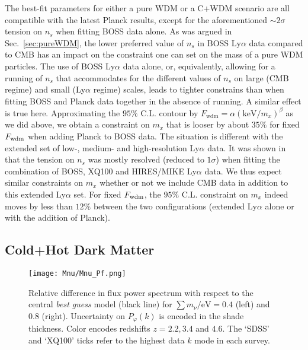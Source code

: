 The best-fit parameters for either a pure WDM or a C+WDM scenario are all compatible with the latest Planck results, except for the aforementioned $\sim 2\sigma$ tension on $n_s$ when fitting BOSS data alone.  As was argued in Sec.~\ref{sec:pureWDM}, the lower preferred value of $n_s$ in BOSS Ly$\alpha$ data compared to CMB has an impact on the constraint one can set on the mass of a pure WDM particles. The use of  BOSS Ly$\alpha$ data alone, or, equivalently, allowing for a running of $n_s$ that accommodates for the different values of $n_s$ on large (CMB regime) and small (Ly$\alpha$ regime) scales, leads to tighter constrains than when fitting  BOSS and Planck data together in the absence of running. A similar effect is true here. Approximating the $95\%$ C.L. contour by  $F_{\mathrm{wdm}} = \alpha(\mathrm{keV}/m_x)^\beta$ as we did above, we obtain a constraint on  $m_x$ that is looser by about $35\%$ for fixed $F_{\rm{wdm}}$ when adding  Planck to BOSS data. The situation is different with the extended set of low-, medium- and high-resolution Ly$\alpha$ data. It was shown in~\cite{Yeche17} that the tension on $n_s$ was mostly resolved (reduced to $1\sigma$) when fitting  the combination of BOSS, XQ100 and HIRES/MIKE Ly$\alpha$ data. We thus expect similar constraints on $m_x$ whether or not we include  CMB data in addition to this extended  Ly$\alpha$ set.   For fixed $F_{\rm{wdm}}$, the $95\%$ C.L. constraint on $m_x$ indeed moves by less than $12\%$ between the two configurations (extended Ly$\alpha$ alone or with the addition of Planck). 


\subsection{Cold+Hot Dark Matter}
\label{sec:lcdmnu}

\begin{figure}[!]
\begin{center}
\texttt{[image: Mnu/Mnu\_Pf.png]}
\caption{Relative difference in flux power spectrum with respect to the central \textit{best guess} model (black line) for $\sum m_\nu / \mathrm{eV} = 0.4$ (left) and $0.8$ (right). Uncertainty on $P_\varphi (k)$ is encoded in the shade thickness. Color encodes redshifts $z=2.2, 3.4$ and $4.6$. The `SDSS' and `XQ100' ticks refer to the highest data $k$ mode in each survey.}
\label{fig:flux_mnu_0408}
\end{center}
\end{figure}

